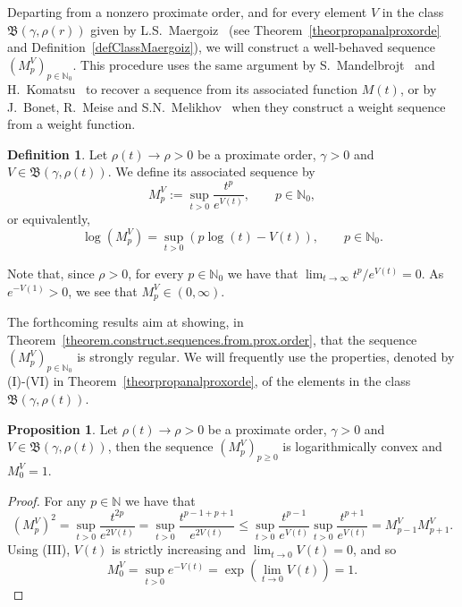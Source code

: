 \documentclass[11pt,a4paper]{article}
\theoremstyle{definition}
\newtheorem{pro}[theo]{Proposition}
\newtheorem{defi}[theo]{Definition}
\newenvironment{prop}{\smallskip\begin{pro}}{\end{pro}\smallskip}
\def\oo{\infty}
\def\ri{\rightarrow}
\def\ga{\gamma}
\def\ro{\rho}
\def\Bet{\mathfrak{B}}
\def\N{\mathbb{N}}
\begin{document}
Departing from a nonzero proximate order,
and for every element $V$ in the class $\Bet(\ga,\ro(r))$
given by L.S.~Maergoiz~\cite{Maergoiz} (see Theorem~\ref{theorpropanalproxorde} and Definition~\ref{defClassMaergoiz}), we will construct a well-behaved sequence $(M_p^V)_{p\in\N_0}$.
This procedure uses the same
argument by S.~Mandelbrojt~\cite{mandelbrojt} and H.~Komatsu~\cite{komatsu} to recover  a sequence from
 its associated function $M(t)$, or by J.~Bonet, R.~Meise and S.N.~Melikhov~\cite{bonetmeisemelikhov} when they construct a weight sequence from a weight function.


\begin{defi}
Let $\ro(t) \ri \ro>0$ be a proximate order,  $\ga>0$ and $V \in \Bet(\ga, \ro(t) )$. We define its associated sequence by
$$
M^V_p:=\sup_{t>0} \frac{t^p}{e^{V(t)}},\qquad p\in\N_0,
$$
or equivalently,
$$
\log(M^V_p)=\sup_{t>0} (p\log(t)-V(t)),\qquad p\in\N_0.
$$
\end{defi}


Note that, since $\rho>0$, for every $p\in\N_0$ we have that $\lim_{t\ri\oo} t^p/e^{V(t)}=0$. As $e^{-V(1)}>0$, we see  that $M^V_p \in (0,\oo)$.

The forthcoming results aim at showing, in Theorem~\ref{theorem.construct.sequences.from.prox.order}, that the sequence $(M_p^V)_{p\in\N_0}$ is strongly regular. We will frequently use the properties, denoted by (I)-(VI) in Theorem~\ref{theorpropanalproxorde}, of the elements in the class $\Bet(\ga, \ro(t) )$.

  \begin{prop}\label{MVlogconvex}
  Let $\ro(t) \ri \ro>0$ be a proximate order,  $\ga>0$ and $V \in \Bet(\ga, \ro(t) )$, then the
  sequence $(M^V_p)_{p\geq0}$ is logarithmically convex and $M^V_0=1$.
 \end{prop}

 \begin{proof}
  For any $p\in\N$ we have that
  $$(M^V_p)^2=\sup_{t>0} \frac{t^{2p}}{e^{2V(t)}} = \sup_{t>0} \frac{t^{p-1+p+1}}{e^{2V(t)}} \leq \sup_{t>0} \frac{t^{p-1}}{e^{V(t)}}
  \sup_{t>0} \frac{t^{p+1}}{e^{V(t)}} = M^V_{p-1}M^V_{p+1}.$$
 Using (III), $V(t)$ is strictly increasing and $\lim_{t\ri0}V(t)=0$, and so
  $$M^V_0=\sup_{t>0} e^{-V(t)} = \exp\left(\lim_{t\ri0}V(t)\right)=1. $$
 \end{proof}
\end{document}
